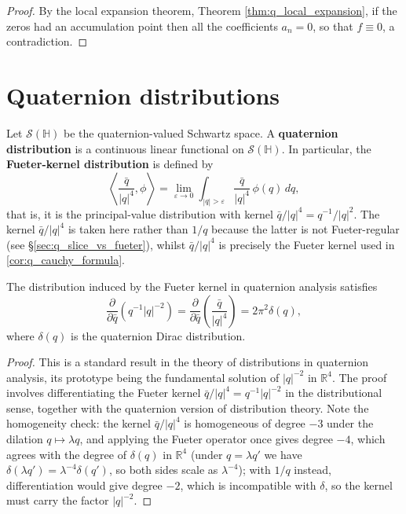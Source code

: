\begin{proof}
By the local expansion theorem, Theorem \ref{thm:q_local_expansion}, if the zeros had an accumulation point then all the coefficients $a_n=0$, so that $f\equiv 0$, a contradiction.
\end{proof}

\section{Quaternion distributions}

\begin{definition}\label{def:q_generalised}
Let $\mathcal{S}(\mathbb{H})$ be the quaternion-valued Schwartz space. A \textbf{quaternion distribution} is a continuous linear functional on $\mathcal{S}(\mathbb{H})$. In particular, the \textbf{Fueter-kernel distribution} is defined by
\[
\left\langle \frac{\bar q}{|q|^4}, \phi\right\rangle
=\lim_{\varepsilon\to 0}\int_{|q|>\varepsilon}\frac{\bar q}{|q|^4}\,\phi(q)\,dq,
\]
that is, it is the principal-value distribution with kernel $\bar q/|q|^4=q^{-1}/|q|^2$. The kernel $\bar q/|q|^4$ is taken here rather than $1/q$ because the latter is not Fueter-regular (see \S\ref{sec:q_slice_vs_fueter}), whilst $\bar q/|q|^4$ is precisely the Fueter kernel used in \ref{cor:q_cauchy_formula}.
\end{definition}

\begin{theorem}\label{thm:q_cauchy_kernel_derivative}
The distribution induced by the Fueter kernel in quaternion analysis satisfies
\[
\frac{\partial}{\partial\bar q}\left(q^{-1}|q|^{-2}\right)
=\frac{\partial}{\partial\bar q}\left(\frac{\bar q}{|q|^4}\right)=2\pi^2\delta(q),
\]
where $\delta(q)$ is the quaternion Dirac distribution.
\end{theorem}

\begin{proof}
This is a standard result in the theory of distributions in quaternion analysis, its prototype being the fundamental solution of $|q|^{-2}$ in $\mathbb{R}^4$. The proof involves differentiating the Fueter kernel $\bar q/|q|^4=q^{-1}|q|^{-2}$ in the distributional sense, together with the quaternion version of distribution theory. Note the homogeneity check: the kernel $\bar q/|q|^4$ is homogeneous of degree $-3$ under the dilation $q\mapsto\lambda q$, and applying the Fueter operator once gives degree $-4$, which agrees with the degree of $\delta(q)$ in $\mathbb{R}^4$ (under $q=\lambda q'$ we have $\delta(\lambda q')=\lambda^{-4}\delta(q')$, so both sides scale as $\lambda^{-4}$); with $1/q$ instead, differentiation would give degree $-2$, which is incompatible with $\delta$, so the kernel must carry the factor $|q|^{-2}$.
\end{proof}

